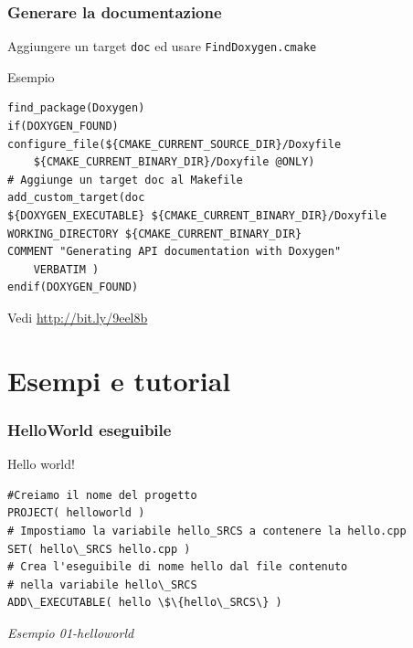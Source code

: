 \documentclass[10pt] {beamer}
\begin{document}

\begin{frame}[fragile]
 \frametitle{Generare la documentazione}
Aggiungere un target \texttt{doc} ed usare \texttt{FindDoxygen.cmake}
\begin{block}{Esempio}
\begin{small}
\begin{verbatim}
find_package(Doxygen)
if(DOXYGEN_FOUND)
configure_file(${CMAKE_CURRENT_SOURCE_DIR}/Doxyfile 
    ${CMAKE_CURRENT_BINARY_DIR}/Doxyfile @ONLY)
# Aggiunge un target doc al Makefile 
add_custom_target(doc
${DOXYGEN_EXECUTABLE} ${CMAKE_CURRENT_BINARY_DIR}/Doxyfile
WORKING_DIRECTORY ${CMAKE_CURRENT_BINARY_DIR}
COMMENT "Generating API documentation with Doxygen" 
    VERBATIM )
endif(DOXYGEN_FOUND)
\end{verbatim}
\end{small}
\end{block}
Vedi \url{http://bit.ly/9eel8b}
\end{frame}

\section{Esempi e tutorial}

\begin{frame}[fragile]
\frametitle{HelloWorld eseguibile}

\begin{block}{Hello world!}
\begin{small}
\begin{verbatim}
#Creiamo il nome del progetto
PROJECT( helloworld )
# Impostiamo la variabile hello_SRCS a contenere la hello.cpp
SET( hello\_SRCS hello.cpp )
# Crea l'eseguibile di nome hello dal file contenuto 
# nella variabile hello\_SRCS
ADD\_EXECUTABLE( hello \$\{hello\_SRCS\} )
\end{verbatim}
\end{small}
\end{block}

\emph{Esempio 01-helloworld}
\end{frame}
\end{document}

